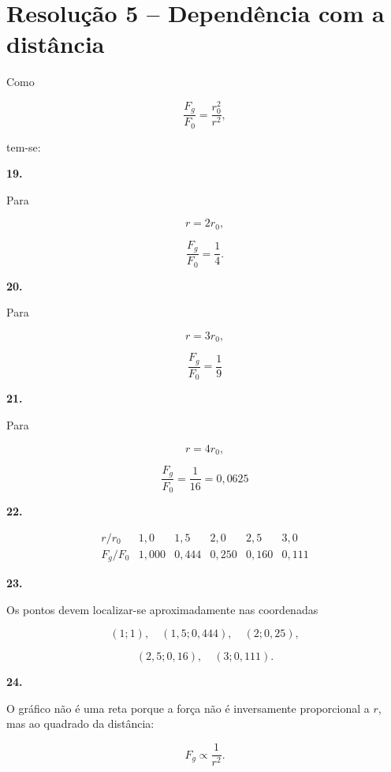 \documentclass[11pt,a4paper]{article}
\begin{document}
	\section*{Resolução 5 -- Dependência com a distância}
	
	\begin{solucaobox}[Questões 19--24]
		
		Como
		
		\[
		\frac{F_g}{F_0}
		=
		\frac{r_0^2}{r^2},
		\]
		
		tem-se:
		
		\vspace{2mm}
		
		\textbf{19.}
		
		Para
		
		\[
		r=2r_0,
		\]
		
		\[
		\frac{F_g}{F_0}
		=
		\frac{1}{4}.
		\]
		
		\vspace{2mm}
		
		\textbf{20.}
		
		Para
		
		\[
		r=3r_0,
		\]
		
		\[
		\boxed{
			\frac{F_g}{F_0}
			=
			\frac{1}{9}
		}
		\]
		
		\vspace{2mm}
		
		\textbf{21.}
		
		Para
		
		\[
		r=4r_0,
		\]
		
		\[
		\boxed{
			\frac{F_g}{F_0}
			=
			\frac{1}{16}
			=
			0{,}0625
		}
		\]
		
		\vspace{3mm}
		
		\textbf{22.}
		
		\[
		\begin{array}{c|ccccc}
			r/r_0 & 1{,}0 & 1{,}5 & 2{,}0 & 2{,}5 & 3{,}0\\
			\hline
			F_g/F_0 &
			1{,}000 &
			0{,}444 &
			0{,}250 &
			0{,}160 &
			0{,}111
		\end{array}
		\]
		
		\vspace{3mm}
		
		\textbf{23.}
		
		Os pontos devem localizar-se aproximadamente nas coordenadas
		
		\[
		(1;1),
		\quad
		(1{,}5;0{,}444),
		\quad
		(2;0{,}25),
		\]
		
		\[
		(2{,}5;0{,}16),
		\quad
		(3;0{,}111).
		\]
		
		\vspace{3mm}
		
		\textbf{24.}
		
		O gráfico não é uma reta porque a força não é inversamente proporcional
		a $r$, mas ao quadrado da distância:
		
		\[
		F_g\propto\frac{1}{r^2}.
		\]
		
	\end{solucaobox}
	
\end{document}

